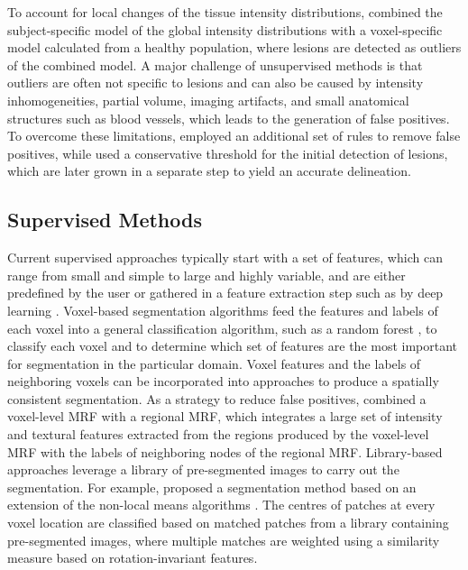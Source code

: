 To account for local changes of the tissue intensity distributions,
\citet{tomas2015} combined the subject-specific model of
the global intensity distributions with a voxel-specific model calculated from a
healthy population, where lesions are detected as outliers of the combined
model. A major challenge of unsupervised methods is that outliers are often not
specific to lesions and can also be caused by intensity inhomogeneities, partial
volume, imaging artifacts, and small anatomical structures such as blood
vessels, which leads to the generation of false positives. To overcome these
limitations, \citet{roura2015} employed an additional set of rules
to remove false positives, while \citet{schmidt2012} used
a conservative threshold for the initial detection of lesions, which are later
grown in a separate step to yield an accurate delineation.

\subsection[Supervised methods]{Supervised Methods}

Current supervised approaches typically start with a set of features, which can
range from small and simple to large and highly variable, and are either
predefined by the user \citep{geremia2010,geremia2011,guizard2015,subbanna2015}
or gathered in a feature extraction step such as by deep learning \citep{yoo2014}.
Voxel-based segmentation algorithms \citep{geremia2010,yoo2014} feed the
features and labels of each voxel into a general classification algorithm, such
as a random forest \citep{breiman2001}, to classify each voxel and to determine
which set of features are the most important for segmentation in the particular
domain. Voxel features and the labels of neighboring voxels can be incorporated
into  approaches
\citep{subbanna2009,subbanna2015} to produce a spatially consistent
segmentation. As a strategy to reduce false positives, \citet{subbanna2015}
combined a voxel-level MRF with a regional MRF, which integrates a large
set of intensity and textural features extracted from the regions produced by the
voxel-level MRF with the labels of neighboring nodes of the regional MRF.
Library-based approaches leverage a library of pre-segmented images to carry out
the segmentation. For example, \citet{guizard2015} proposed a segmentation
method based on an extension of the non-local means algorithms
\citep{coupe2011}. The centres of patches at every voxel location are classified
based on matched patches from a library containing pre-segmented images, where
multiple matches are weighted using a similarity measure based on
rotation-invariant features.

